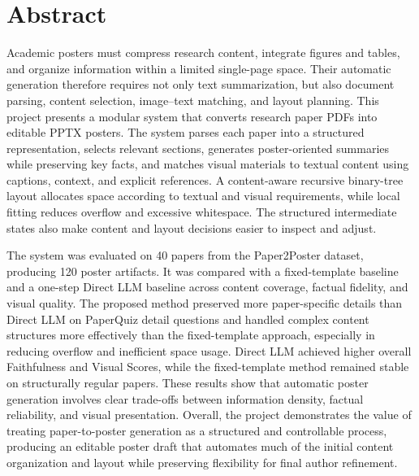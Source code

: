 \documentclass[12pt,oneside]{report}
\date{September 2026}
\begin{document}


\clearpage{\pagestyle{empty}\cleardoublepage}
\setcounter{page}{1}
\pagestyle{fancy}


\chapter*{Abstract}

Academic posters must compress research content, integrate figures and tables, and organize information within a limited single-page space. Their automatic generation therefore requires not only text summarization, but also document parsing, content selection, image–text matching, and layout planning. This project presents a modular system that converts research paper PDFs into editable PPTX posters. The system parses each paper into a structured representation, selects relevant sections, generates poster-oriented summaries while preserving key facts, and matches visual materials to textual content using captions, context, and explicit references. A content-aware recursive binary-tree layout allocates space according to textual and visual requirements, while local fitting reduces overflow and excessive whitespace. The structured intermediate states also make content and layout decisions easier to inspect and adjust.

\vspace{1em}

The system was evaluated on 40 papers from the Paper2Poster dataset, producing 120 poster artifacts. It was compared with a fixed-template baseline and a one-step Direct LLM baseline across content coverage, factual fidelity, and visual quality. The proposed method preserved more paper-specific details than Direct LLM on PaperQuiz detail questions and handled complex content structures more effectively than the fixed-template approach, especially in reducing overflow and inefficient space usage. Direct LLM achieved higher overall Faithfulness and Visual Scores, while the fixed-template method remained stable on structurally regular papers. These results show that automatic poster generation involves clear trade-offs between information density, factual reliability, and visual presentation. Overall, the project demonstrates the value of treating paper-to-poster generation as a structured and controllable process, producing an editable poster draft that automates much of the initial content organization and layout while preserving flexibility for final author refinement.
\end{document}
